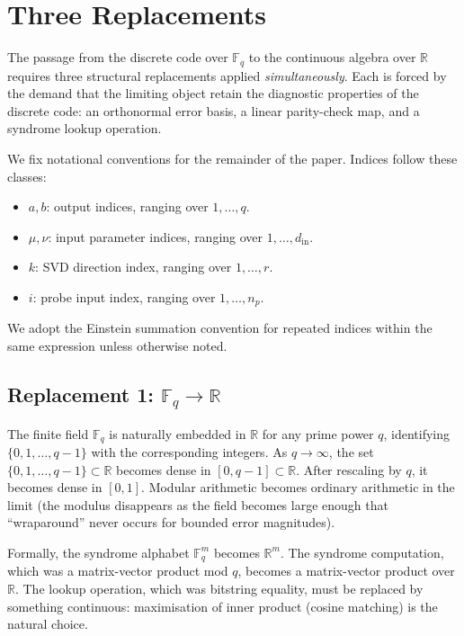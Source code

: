 \documentclass[11pt,a4paper]{article}
\theoremstyle{definition}
\newcommand{\Rbb}{\mathbb{R}}
\newcommand{\Fbb}{\mathbb{F}}
\newcommand{\dimin}{d_{\mathrm{in}}}
\begin{document}
\section{Three Replacements}
\label{sec:replacements}

The passage from the discrete code over $\Fbb_q$ to the continuous algebra over $\Rbb$ requires three structural replacements applied \emph{simultaneously}. Each is forced by the demand that the limiting object retain the diagnostic properties of the discrete code: an orthonormal error basis, a linear parity-check map, and a syndrome lookup operation.

We fix notational conventions for the remainder of the paper. Indices follow these classes:
\begin{itemize}[nosep]
  \item $a, b$: output indices, ranging over $1,\dots,q$.
  \item $\mu, \nu$: input parameter indices, ranging over
    $1,\dots,\dimin$.
  \item $k$: SVD direction index, ranging over $1,\dots,r$.
  \item $i$: probe input index, ranging over $1,\dots,n_p$.
\end{itemize}
We adopt the Einstein summation convention for repeated indices within the same expression unless otherwise noted.

\subsection{Replacement 1: \texorpdfstring{$\Fbb_q \to \Rbb$}{F\_q to R}}
\label{sec:rep1}

The finite field $\Fbb_q$ is naturally embedded in $\Rbb$ for any prime power $q$, identifying $\{0,1,\ldots,q-1\}$ with the corresponding integers. As $q\to\infty$, the set $\{0,1,\ldots,q-1\}\subset\Rbb$ becomes dense in $[0,q-1]\subset\Rbb$. After rescaling by $q$, it becomes dense in $[0,1]$. Modular arithmetic becomes ordinary arithmetic in the limit (the modulus disappears as the field becomes large enough that ``wraparound'' never occurs for bounded error magnitudes).

Formally, the syndrome alphabet $\Fbb_q^m$ becomes $\Rbb^m$. The syndrome computation, which was a matrix-vector product mod $q$, becomes a matrix-vector product over $\Rbb$. The lookup operation, which was bitstring equality, must be replaced by something continuous: maximisation of inner product (cosine matching) is the natural choice.
\end{document}
